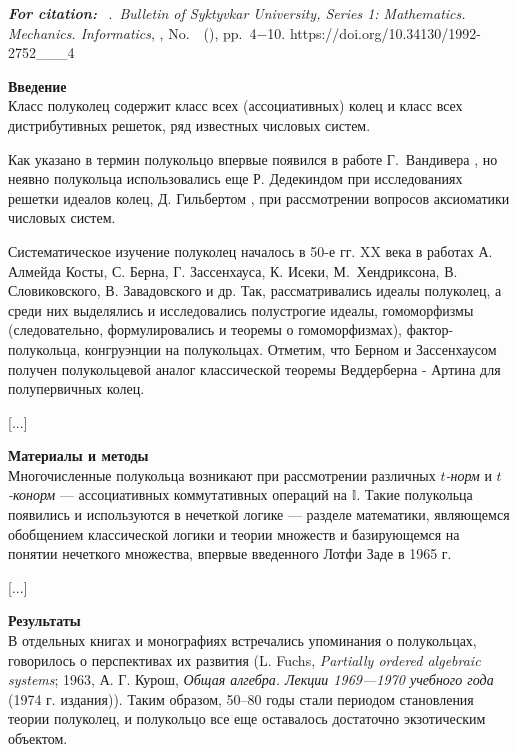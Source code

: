 \documentclass[a4paper,12pt]{book}
\begin{document}
\begin{paper}
		\textbf{\itshape For citation: } \theengcontauth~\theengconttit.~\textit{Bulletin of Syk\-tyv\-kar  University, Series 1: Mathematics. Mechanics. Informatics}, \theyear, No.~\thenumb~(\thesubnumb), pp.~4$-$10. https://doi.org/10.34130/1992-2752\_\theyear\_\thenumb\_4
		
		\vspace{5mm}
		
		\textbf{Введение}\\
		Класс полуколец содержит класс всех (ассоциативных) колец и класс всех дистрибутивных решеток, ряд известных числовых систем.
		
		Как указано в \cite{golan99} термин полукольцо впервые появился в работе Г.~Вандивера \cite{vand34}, но неявно полукольца использовались еще Р. Дедекиндом \cite{ded1894} при исследованиях решетки идеалов колец,  Д. Гильбертом \cite{hilb1899}, при рассмотрении вопросов аксиоматики числовых систем.
		
		Систематическое изучение полуколец началось в 50-е гг. XX века в работах А. Алмейда Косты, С. Берна,  Г. Зассенхауса, К. Исеки, М.~Хендриксона, В. Словиковского, В. Завадовского и др.  Так, рассматривались идеалы полуколец, а среди них выделялись и исследовались полустрогие идеалы, гомоморфизмы (следовательно, формулировались и теоремы о гомоморфизмах), фактор-полукольца, конгруэнции на полукольцах. Отметим, что Берном и Зассенхаусом получен полукольцевой аналог классической теоремы Веддерберна - Артина для полупервичных колец.
		
		[...]
		
		\textbf{Материалы и методы}\\
		Многочисленные полукольца возникают при рассмотрении различных \textit{$t$-норм} и \textit{$t$-конорм} --- ассоциативных коммутативных операций на $\mathbb I$. Такие полукольца появились и используются в нечеткой логике --- разделе математики, являющемся обобщением классической логики и теории множеств и базирующемся на понятии нечеткого множества, впервые введенного Лотфи Заде в 1965 г.
		
		[...]
		
		\textbf{Результаты}\\
		В отдельных книгах и монографиях встречались упоминания о полукольцах, говорилось о перспективах их развития (L. Fuchs, {\it Partially ordered algebraic systems}; 1963, А. Г. Курош, \textit{Общая алгебра. Лекции 1969—1970 учебного года} (1974 г. издания)). Таким образом,  50--80 годы стали периодом становления теории полуколец, и полукольцо все еще оставалось достаточно экзотическим объектом.
		

\end{paper}
\end{document}
